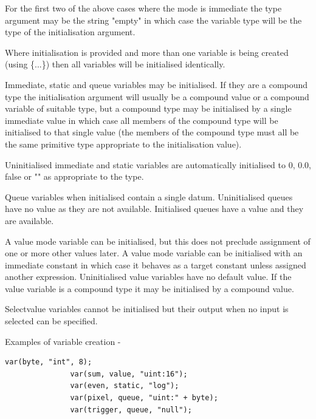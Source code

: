             For the first two of the above cases where the mode is immediate the
            type argument may be the string "empty" in which case the variable type
            will be the type of the initialisation argument.
            
            Where initialisation is provided and more than one variable is being
            created (using \{...\}) then all variables will be initialised
            identically.

            Immediate, static and queue variables may be initialised. If they are a
            compound type the initialisation argument will usually be a compound
            value or a compound variable of suitable type, but a compound
            type may be initialised by a single immediate value in which case all
            members of the compound type will be initialised to that single value
            (the members of the compound type must all be the same primitive type
            appropriate to the initialisation value).

            Uninitialised immediate and static variables are automatically
            initialised to 0, 0.0, false or "" as appropriate to the type.

            Queue variables when initialised contain a single datum.
            Uninitialised queues have no value as they are not available.
            Initialised queues have a value and they are available.

            A value mode variable can be initialised, but this does not preclude
            assignment of one or more other values later. A value mode variable can
            be initialised with an immediate constant in which case it behaves as a
            target constant unless assigned another expression. Uninitialised value
            variables have no default value. If the value variable is a compound
            type it may be initialised by a compound value.

            Selectvalue variables cannot be initialised but their output when
            no input is selected can be specified.

            Examples of variable creation -
            \begin{lstlisting}[gobble=12, language=threepl]
               var(byte, "int", 8);
               var(sum, value, "uint:16");
               var(even, static, "log");
               var(pixel, queue, "uint:" + byte);
               var(trigger, queue, "null");
            \end{lstlisting}

